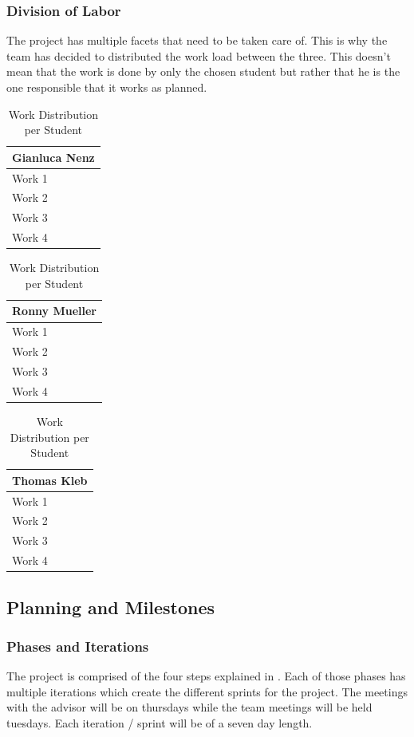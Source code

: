 \subsubsection*{Division of Labor}
The project has multiple facets that need to be taken care of. This is why the team has decided to distributed the work load between the three. This doesn't mean that the work is done by only the chosen student but rather that he is the one responsible that it works as planned.
\begin{table}[H]
    \begin{tabular}[t]{||p{4cm}||}
        \hline
        Gianluca Nenz \\
        \hline\hline
        Work 1 \\ 
        \hline
        Work 2 \\
        \hline
        Work 3 \\ 
        \hline
        Work 4\\[1ex] 
        \hline
    \end{tabular}
    \hfill
    \begin{tabular}[t]{||p{4cm}||}
        \hline
        Ronny Mueller \\
        \hline\hline
        Work 1 \\ 
        \hline
        Work 2 \\
        \hline
        Work 3 \\ 
        \hline
        Work 4\\[1ex] 
        \hline
    \end{tabular}
    \hfill
    \begin{tabular}[t]{||p{4cm}||}
        \hline
        Thomas Kleb \\
        \hline\hline
        Work 1 \\ 
        \hline
        Work 2 \\
        \hline
        Work 3 \\ 
        \hline
        Work 4\\[1ex] 
        \hline
    \end{tabular}
    \caption{Work Distribution per Student}
    \label{work_dis}
\end{table}

\subsection{Planning and Milestones}

\subsubsection*{Phases and Iterations}
The project is comprised of the four steps explained in . Each of those phases has multiple iterations which create the different sprints for the project. The meetings with the advisor will be on thursdays while the team meetings will be held tuesdays. Each iteration / sprint will be of a seven day length. \\

